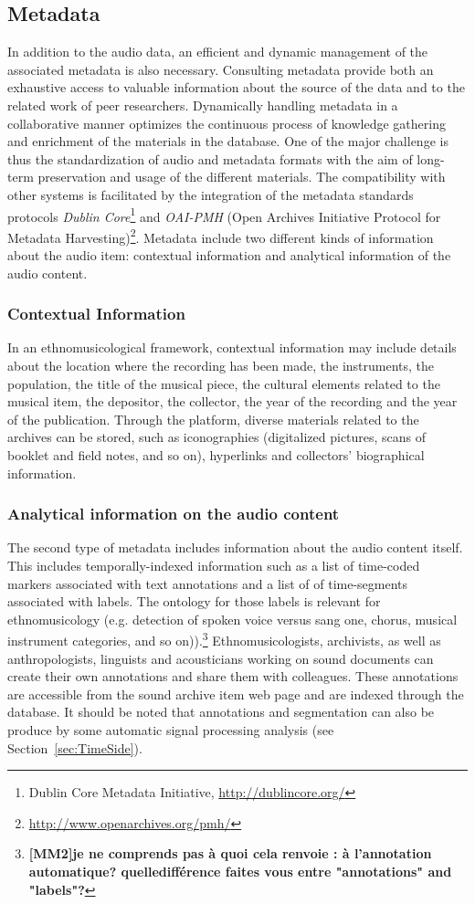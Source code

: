 \documentclass{sig-alternate}
\newcommand{\comment}[1]{\footnote{\color{red} \bf{{#1}}}}
\begin{document}
\subsection{Metadata}\label{sec:metadata}
In addition to the audio data, an efficient and dynamic management of the associated metadata is also necessary. Consulting metadata provide both an exhaustive access to valuable information about the source of the data and to the related work of peer researchers. 
Dynamically handling metadata in a collaborative manner optimizes the continuous process of knowledge gathering and enrichment of the materials in the database.  
One of the major challenge is thus the standardization of audio and metadata formats with the aim of long-term preservation and usage of the different materials.
The compatibility with other systems is facilitated by the integration of the metadata standards protocols \emph{Dublin Core}\footnote{{Dublin Core} Metadata Initiative, \url{http://dublincore.org/}} and \emph{OAI-PMH} (Open Archives Initiative Protocol for Metadata Harvesting)\footnote{\url{http://www.openarchives.org/pmh/}}.
Metadata include two different kinds of information about the audio item: contextual information and analytical information of the audio content.
\subsubsection{Contextual Information}
In an ethnomusicological framework, contextual information may include details about the location where the recording has been made, the instruments, the population, the title of the musical piece, the cultural elements related to the musical item, the depositor, the collector, the year of the recording and the year of the publication. 
Through the platform, diverse materials related to the archives can be stored, such as iconographies (digitalized pictures, scans of booklet and field notes, and so on), hyperlinks and collectors' biographical information. 

\subsubsection{Analytical information on the audio content}
The second type of metadata includes information about the audio content itself.
This includes temporally-indexed information such as a list of time-coded markers associated with text annotations and a list of of time-segments associated with labels. The ontology for those labels is relevant for ethnomusicology (e.g. detection of spoken voice versus sang one, chorus, musical instrument categories, and so on)).\comment{[MM2]je ne comprends pas à quoi cela renvoie : à l'annotation automatique?
quelledifférence faites vous entre "annotations" and "labels"?}
Ethnomusicologists, archivists, as well as anthropologists, linguists and acousticians working on sound documents can create their own annotations and share them with colleagues. These annotations are accessible from the sound archive item web page and are indexed through the database.
It should be noted that annotations and segmentation can also be produce by some automatic signal processing analysis (see Section~\ref{sec:TimeSide}).
\end{document}
